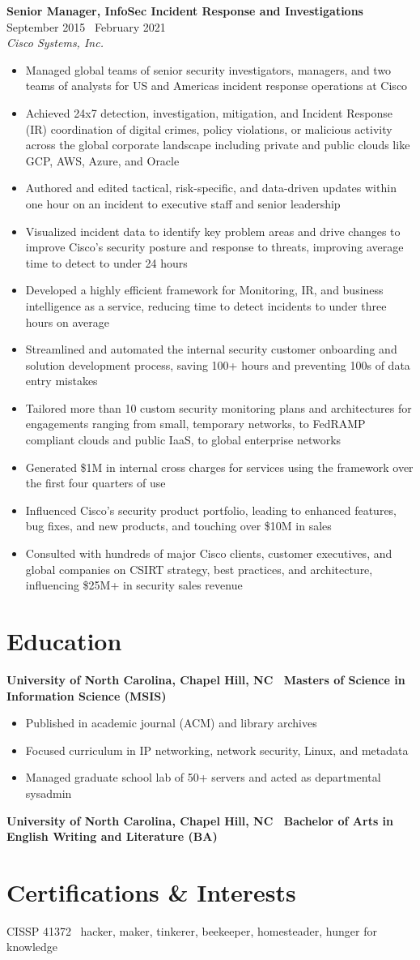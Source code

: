 \documentclass[10.5pt]{article}
\newcommand{\role}[3]{%
  \noindent\textbf{#1} \hfill {\small\color{darkgray} #3}\\
  {\itshape\small #2}\par\smallskip
}
\begin{document}
\role{Senior Manager, InfoSec Incident Response and Investigations}{Cisco Systems, Inc.}{September 2015 \textendash\ February 2021}
\begin{itemize}
  \item Managed global teams of senior security investigators, managers, and two teams of analysts for US and Americas incident response operations at Cisco
  \item Achieved 24x7 detection, investigation, mitigation, and Incident Response (IR) coordination of digital crimes, policy violations, or malicious activity across the global corporate landscape including private and public clouds like GCP, AWS, Azure, and Oracle
  \item Authored and edited tactical, risk-specific, and data-driven updates within one hour on an incident to executive staff and senior leadership
  \item Visualized incident data to identify key problem areas and drive changes to improve Cisco's security posture and response to threats, improving average time to detect to under 24 hours
  \item Developed a highly efficient framework for Monitoring, IR, and business intelligence as a service, reducing time to detect incidents to under three hours on average
  \item Streamlined and automated the internal security customer onboarding and solution development process, saving 100+ hours and preventing 100s of data entry mistakes
  \item Tailored more than 10 custom security monitoring plans and architectures for engagements ranging from small, temporary networks, to FedRAMP compliant clouds and public IaaS, to global enterprise networks
  \item Generated \$1M in internal cross charges for services using the framework over the first four quarters of use
  \item Influenced Cisco's security product portfolio, leading to enhanced features, bug fixes, and new products, and touching over \$10M in sales
  \item Consulted with hundreds of major Cisco clients, customer executives, and global companies on CSIRT strategy, best practices, and architecture, influencing \$25M+ in security sales revenue
\end{itemize}

\section*{Education}
\textbf{University of North Carolina, Chapel Hill, NC \textemdash\ Masters of Science in Information Science (MSIS)}
\begin{itemize}
  \item Published in academic journal (ACM) and library archives
  \item Focused curriculum in IP networking, network security, Linux, and metadata
  \item Managed graduate school lab of 50+ servers and acted as departmental sysadmin
\end{itemize}
\textbf{University of North Carolina, Chapel Hill, NC \textemdash\ Bachelor of Arts in English Writing and Literature (BA)}

\section*{Certifications \& Interests}
CISSP 41372 \textbullet\ hacker, maker, tinkerer, beekeeper, homesteader, hunger for knowledge
\end{document}
